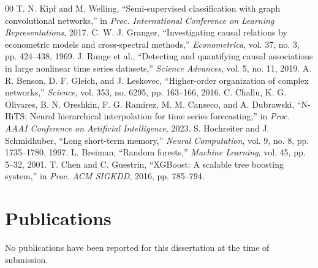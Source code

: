 \documentclass[12pt,a4paper]{report}
\begin{document}

\begin{thebibliography}{00}
	 T. N. Kipf and M. Welling, ``Semi-supervised classification with graph convolutional networks,'' in \textit{Proc. International Conference on Learning Representations}, 2017.
	 C. W. J. Granger, ``Investigating causal relations by econometric models and cross-spectral methods,'' \textit{Econometrica}, vol. 37, no. 3, pp. 424--438, 1969.
	 J. Runge et al., ``Detecting and quantifying causal associations in large nonlinear time series datasets,'' \textit{Science Advances}, vol. 5, no. 11, 2019.
	 A. R. Benson, D. F. Gleich, and J. Leskovec, ``Higher-order organization of complex networks,'' \textit{Science}, vol. 353, no. 6295, pp. 163--166, 2016.
	 C. Challu, K. G. Olivares, B. N. Oreshkin, F. G. Ramirez, M. M. Canseco, and A. Dubrawski, ``N-HiTS: Neural hierarchical interpolation for time series forecasting,'' in \textit{Proc. AAAI Conference on Artificial Intelligence}, 2023.
	 S. Hochreiter and J. Schmidhuber, ``Long short-term memory,'' \textit{Neural Computation}, vol. 9, no. 8, pp. 1735--1780, 1997.
	 L. Breiman, ``Random forests,'' \textit{Machine Learning}, vol. 45, pp. 5--32, 2001.
	 T. Chen and C. Guestrin, ``XGBoost: A scalable tree boosting system,'' in \textit{Proc. ACM SIGKDD}, 2016, pp. 785--794.
\end{thebibliography}

\chapter*{Publications}
\begin{enumerate}[{[1]}]
	\item No publications have been reported for this dissertation at the time of submission.
\end{enumerate}
\end{document}
